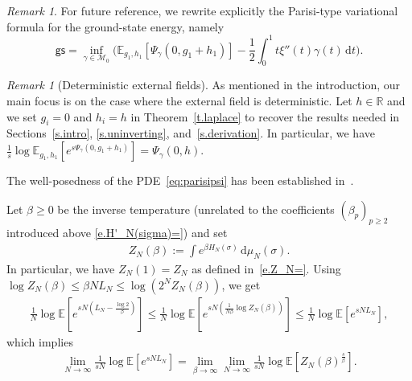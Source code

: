\documentclass[11pt]{amsart}
\theoremstyle{remark}
\newtheorem{remark}[proposition]{Remark}
\theoremstyle{definition}
\numberwithin{equation}{section}
\numberwithin{proposition}{section}
\numberwithin{figure}{section}
\numberwithin{table}{section}
\newcommand{\R}{\mathbb{R}}
\newcommand{\E}{\mathbb{E}}
\renewcommand{\leq}{\leqslant}
\renewcommand{\geq}{\geqslant}
\newcommand{\Ll}{\left}
\newcommand{\Rr}{\right}
\renewcommand{\d}{\mathrm{d}}
\newcommand{\1}{\mathbf{1}}
\newcommand{\msf}{\mathsf}
\newcommand{\cM}{\mathcal{M}}
\newcommand{\gs}{\msf {gs}}
\begin{document}
\begin{remark}  %
For future reference, we rewrite explicitly the Parisi-type variational formula for the ground-state energy, namely
\begin{equation}  
\label{e.def.gs}
\gs = \inf_{\gamma \in \cM_{0 }}\bigg( \E_{g_1,h_1}\Ll[\Psi_{\gamma}(0,g_1 + h_1)\Rr] - \frac{1}{2} \int_0^1 t \xi''(t) \gamma(t) \, \d t \bigg).
\end{equation}
\end{remark}

\begin{remark}[Deterministic external fields]\label{r.determ_ext_field}
As mentioned in the introduction, our main focus is on the case where the external field is deterministic. Let $h\in\R$ and we set $g_i=0$ and $h_i=h$ in Theorem~\ref{t.laplace} to recover the results needed in Sections~\ref{s.intro}, \ref{s.uninverting}, and~\ref{s.derivation}. In particular, we have $\frac 1 s \log \E_{g_1,h_1}\Ll[e^{s\Psi_{\gamma}(0,g_1+h_1)}\Rr] = \Psi_{\gamma}(0,h)$.
\end{remark}


The well-posedness of the PDE~\eqref{eq:parisipsi} has been established in~\cite{auffinger2017parisi,chen2018energy}.


Let $\beta\geq0$ be the inverse temperature (unrelated to the coefficients $(\beta_p)_{p\geq 2}$ introduced above \eqref{e.H'_N(sigma)=}) and set
\begin{align*}
    Z_N(\beta) := \int e^{\beta H_N(\sigma) } \, \d\mu_N(\sigma).
\end{align*}
In particular, we have $Z_N(1)=Z_N$ as defined in~\eqref{e.Z_N=}.
Using $\log Z_N(\beta)\leq \beta NL_N\leq \log \Ll(2^NZ_N(\beta)\Rr)$, we get
\begin{align*}
     \frac{1}{N}  \log \E\Ll[ e^{sN ( L_N - \frac{\log 2}{\beta}) }\Rr]  \leq  \frac{1}{N} \log \E \Ll[e^{sN( \frac{1}{N\beta}  \log Z_N(\beta) )} \Rr] \leq \frac{1}{N}  \log \E \Ll[e^{sN L_N} \Rr],
\end{align*}
which implies
\begin{align}\label{e.lim1/sNloge^sNL_N}
    \lim_{N\to\infty}\frac{1}{sN}\log \E\Ll[e^{sNL_N}\Rr] = \lim_{\beta\to \infty}\lim_{N\to\infty}\frac{1}{sN}\log \E\Ll[Z_N(\beta)^\frac{s}{\beta}\Rr].
\end{align}
\end{document}
